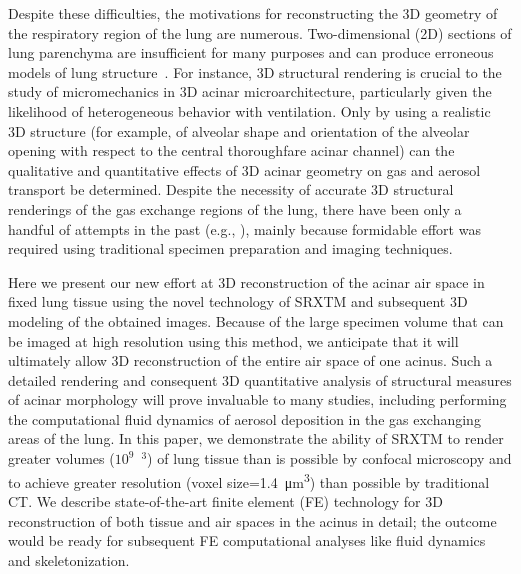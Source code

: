 Despite these difficulties, the motivations for reconstructing the 3D geometry of the respiratory region of the lung are numerous. Two-dimensional (2D) sections of lung parenchyma are insufficient for many purposes and can produce erroneous models of lung structure~\cite{Cookson1993}. For instance, 3D structural rendering is crucial to the study of micromechanics in 3D acinar microarchitecture, particularly given the likelihood of heterogeneous behavior with ventilation. Only by using a realistic 3D structure (for example, of alveolar shape and orientation of the alveolar opening with respect to the central thoroughfare acinar channel) can the qualitative and quantitative effects of 3D acinar geometry on gas and aerosol transport be determined. Despite the necessity of accurate 3D structural renderings of the gas exchange regions of the lung, there have been only a handful of attempts in the past (e.g., \cite{Berend1991,Cookson1993,Honda2002,Litzlbauer2006,Mercer1987,Mercer1987a,Randell1989,Stelter1966,Watz2005}), mainly because formidable effort was required using traditional specimen preparation and imaging techniques.

Here we present our new effort at 3D reconstruction of the acinar air space in fixed lung tissue using the novel technology of SRXTM and subsequent 3D modeling of the obtained images. Because of the large specimen volume that can be imaged at high resolution using this method, we anticipate that it will ultimately allow 3D reconstruction of the entire air space of one acinus. Such a detailed rendering and consequent 3D quantitative analysis of structural measures of acinar morphology will prove invaluable to many studies, including performing the computational fluid dynamics of aerosol deposition in the gas exchanging areas of the lung. In this paper, we demonstrate the ability of SRXTM to render greater volumes ($10^9$~\micro\meter$^3$) of lung tissue than is possible by confocal microscopy and to achieve greater resolution (voxel size=\SI{1.4}{\micro\meter\cubed}) than possible by traditional \micro CT. We describe state-of-the-art finite element (FE) technology for 3D reconstruction of both tissue and air spaces in the acinus in detail; the outcome would be ready for subsequent FE computational analyses like fluid dynamics and skeletonization.

